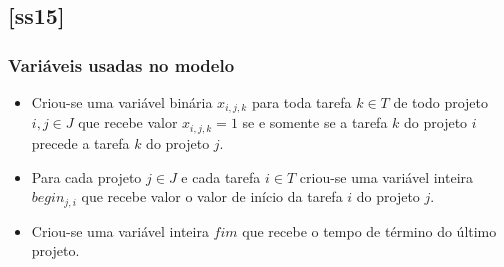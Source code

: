 \documentclass[11pt,letterpaper]{article}
\begin{document}
\subsection{{[}ss15{]}}
\subsubsection*{Variáveis usadas no modelo}
\begin{itemize}
\item Criou-se uma variável binária $x_{i,j,k}$ para toda tarefa $k \in T$ de todo projeto $i, j  \in J$ que recebe valor $x_{i,j,k}=1$ se e somente se a tarefa $k$ do projeto $i$ precede a tarefa $k$ do projeto $j$.

\item Para cada projeto $j \in J$ e cada tarefa $i \in T$ criou-se uma variável inteira $begin_{j,i}$
  que recebe valor o valor de início da tarefa $i$ do projeto $j$.

\item Criou-se uma variável inteira $fim$ que recebe o tempo de término
  do último projeto.

\end{itemize}
\end{document}
